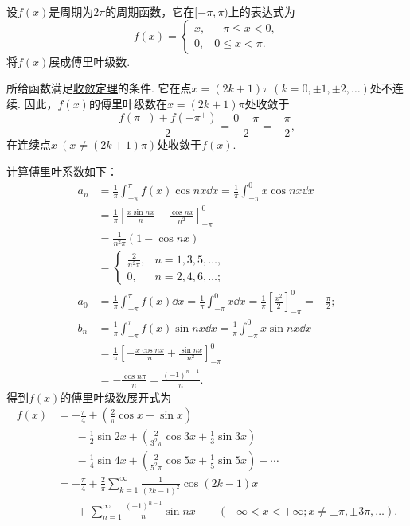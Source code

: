 \begin{example}
设\(f(x)\)是周期为\(2\pi\)的周期函数，它在\([-\pi,\pi)\)上的表达式为\[
f(x) = \left\{ \begin{array}{cc}
x, & -\pi \leq x < 0, \\
0, & 0 \leq x < \pi.
\end{array} \right.
\]
将\(f(x)\)展成傅里叶级数.
\begin{solution}
所给函数满足\hyperref[theorem:无穷级数.傅里叶级数收敛的狄利克雷充分条件]{收敛定理}的条件.
它在点\(x=(2k+1)\pi\ (k=0,\pm1,\pm2,\dotsc)\)处不连续.
因此，\(f(x)\)的傅里叶级数在\(x=(2k+1)\pi\)处收敛于\[
\frac{f(\pi^-)+f(-\pi^+)}{2} = \frac{0-\pi}{2} = -\frac{\pi}{2},
\]在连续点\(x\ (x\neq(2k+1)\pi)\)处收敛于\(f(x)\).

计算傅里叶系数如下：\begin{align*}
	a_n &= \frac{1}{\pi} \int_{-\pi}^{\pi} f(x) \cos nx \dd{x}
	= \frac{1}{\pi} \int_{-\pi}^0 x \cos nx \dd{x} \\
	&= \frac{1}{\pi} \left[ \frac{x \sin nx}{n} + \frac{\cos nx}{n^2} \right]_{-\pi}^0 \\
	&= \frac{1}{n^2 \pi} (1-\cos nx) \\
	&= \left\{ \begin{array}{cc}
	\frac{2}{n^2 \pi}, & n=1,3,5,\dotsc, \\
	0, & n=2,4,6,\dotsc;
	\end{array} \right. \\
	a_0 &= \frac{1}{\pi} \int_{-\pi}^{\pi} f(x) \dd{x}
	= \frac{1}{\pi} \int_{-\pi}^0 x \dd{x}
	= \frac{1}{\pi} \left[ \frac{x^2}{2} \right]_{-\pi}^0 = -\frac{\pi}{2}; \\
	b_n &= \frac{1}{\pi} \int_{-\pi}^{\pi} f(x) \sin nx \dd{x}
	= \frac{1}{\pi} \int_{-\pi}^0 x \sin nx \dd{x} \\
	&= \frac{1}{\pi} \left[ -\frac{x \cos nx}{n} + \frac{\sin nx}{n^2} \right]_{-\pi}^0 \\
	&= -\frac{\cos n\pi}{n} = \frac{(-1)^{n+1}}{n}.
\end{align*}
得到\(f(x)\)的傅里叶级数展开式为\begin{align*}
	f(x) &= -\frac{\pi}{4} + \left(\frac{2}{\pi} \cos x + \sin x\right) \\
	&\hspace{20pt}-\frac{1}{2}\sin 2x + \left(\frac{2}{3^2\pi}\cos 3x + \frac{1}{3}\sin 3x\right) \\
	&\hspace{20pt}-\frac{1}{4}\sin 4x + \left(\frac{2}{5^2\pi}\cos 5x + \frac{1}{5}\sin 5x\right)
	-\dotsb \\
	&= -\frac{\pi}{4} + \frac{2}{\pi} \sum\limits_{k=1}^\infty \frac{1}{(2k-1)^2} \cos(2k-1)x \\
	&\hspace{20pt}+\sum\limits_{n=1}^\infty \frac{(-1)^{n-1}}{n} \sin nx
		\qquad(-\infty<x<+\infty; x\neq\pm\pi,\pm3\pi,\dotsc).
\end{align*}
\end{solution}
\end{example}

